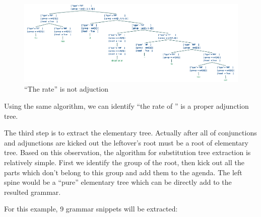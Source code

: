 \documentclass[a4paper]{article}
\begin{document}
\begin{figure}[h]
    \begin{center}
        \includegraphics[scale=0.4]{noadj.png}
    \end{center}
    \caption{``The rate'' is not adjuction}
    \label{fig:no-adjunct}
\end{figure}

Using the same algorithm, we can identify ``the rate of '' is a proper adjunction tree.

The third step is to extract the elementary tree. Actually after all of conjunctions and adjunctions are kicked out the leftover's root must be a root of elementary tree. Based on this observation, the algorithm for substitution tree extraction is relatively simple. First we identify the group of the root, then kick out all the parts which don't belong to this group and add them to the agenda. The left spine would be a ``pure'' elementary tree which can be directly add to the resulted grammar.

For this example, 9 grammar snippets will be extracted:
\end{document}
